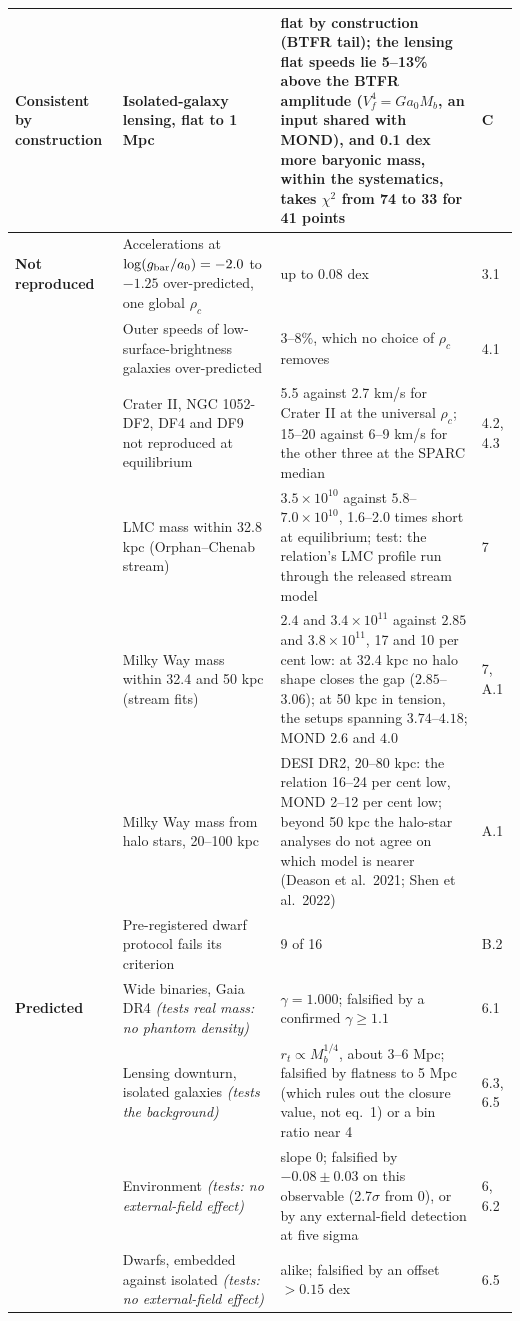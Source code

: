 \documentclass[
  10pt,
]{article}
\begin{document}
{\begin{longtable}[]{@{}>{\raggedright\arraybackslash}p{2.4cm}p{5.6cm}p{5.5cm}p{1.5cm}@{}}
\midrule
\textbf{Consistent by construction} & Isolated-galaxy lensing, flat to 1 Mpc & flat by construction (BTFR tail); the lensing flat speeds lie 5--13\% above the BTFR amplitude ($V_f^4=Ga_0M_b$, an input shared with MOND), and 0.1 dex more baryonic mass, within the systematics, takes $\chi^2$ from 74 to 33 for 41 points & C\tabularnewline
\midrule
\textbf{Not reproduced} & Accelerations at $\log(g_{\rm bar}/a_0)=-2.0$ to $-1.25$ over-predicted, one global $\rho_c$ & up to 0.08 dex & 3.1\tabularnewline\addlinespace[5pt]
 & Outer speeds of low-surface-brightness galaxies over-predicted & 3--8\%, which no choice of $\rho_c$ removes & 4.1\tabularnewline\addlinespace[5pt]
 & Crater II, NGC 1052-DF2, DF4 and DF9 not reproduced at equilibrium & 5.5 against 2.7 km/s for Crater II at the universal $\rho_c$; 15--20 against 6--9 km/s for the other three at the SPARC median & 4.2, 4.3\tabularnewline\addlinespace[5pt]
 & LMC mass within 32.8 kpc (Orphan--Chenab stream) & $3.5\times10^{10}$ against $5.8$--$7.0\times10^{10}$, \mbox{1.6--2.0} times short at equilibrium; test: the relation's LMC profile run through the released stream model & 7\tabularnewline\addlinespace[5pt]
 & Milky Way mass within 32.4 and 50 kpc (stream fits) & $2.4$ and $3.4\times10^{11}$ against $2.85$ and $3.8\times10^{11}$, 17 and 10 per cent low: at 32.4 kpc no halo shape closes the gap (\mbox{$2.85$--$3.06$}); at 50 kpc in tension, the setups spanning $3.74$--$4.18$; MOND $2.6$ and $4.0$ & 7, A.1\tabularnewline\addlinespace[5pt]
 & Milky Way mass from halo stars, 20--100 kpc & DESI DR2, 20--80 kpc: the relation 16--24 per cent low, MOND 2--12 per cent low; beyond 50 kpc the halo-star analyses do not agree on which model is nearer (Deason et al.~2021; Shen et al.~2022) & A.1\tabularnewline\addlinespace[5pt]
 & Pre-registered dwarf protocol fails its criterion & 9 of 16 & B.2\tabularnewline
\midrule
\textbf{Predicted} & Wide binaries, Gaia DR4 \emph{(tests real mass: no phantom density)} & $\gamma=1.000$; falsified by a confirmed $\gamma\ge1.1$ & 6.1\tabularnewline\addlinespace[5pt]
 & Lensing downturn, isolated galaxies \emph{(tests the background)} & $r_t\propto M_b^{1/4}$, about 3--6 Mpc; falsified by flatness to 5 Mpc (which rules out the closure value, not eq.~1) or a bin ratio near 4 & 6.3, 6.5\tabularnewline\addlinespace[5pt]
 & Environment \emph{(tests: no external-field effect)} & slope 0; falsified by $-0.08\pm0.03$ on this observable (2.7$\sigma$ from 0), or by any external-field detection at five sigma & 6, 6.2\tabularnewline\addlinespace[5pt]
 & Dwarfs, embedded against isolated \emph{(tests: no external-field effect)} & alike; falsified by an offset $>0.15$ dex & 6.5\tabularnewline

\end{longtable}}
\end{document}
